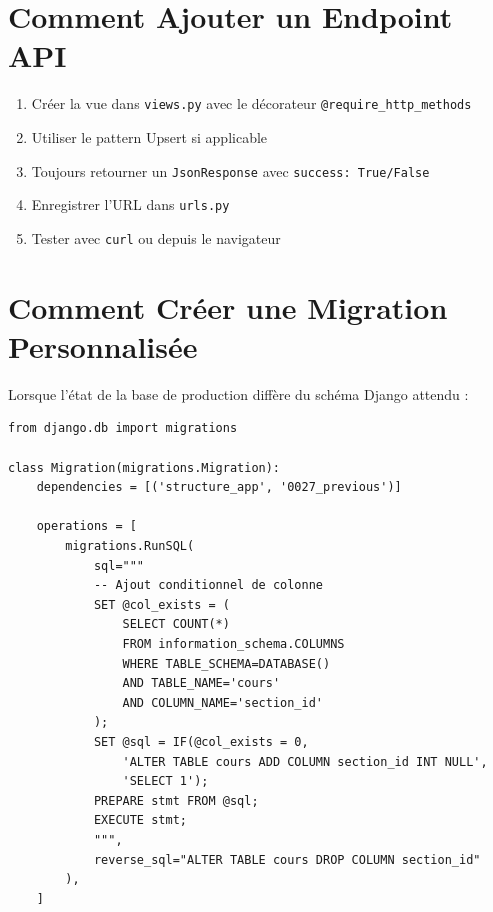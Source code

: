 \documentclass[12pt,a4paper,oneside]{report}
\begin{document}
\section{Comment Ajouter un Endpoint API}

\begin{enumerate}
  \item Créer la vue dans \texttt{views.py} avec le décorateur \texttt{@require\_http\_methods}
  \item Utiliser le pattern Upsert si applicable
  \item Toujours retourner un \texttt{JsonResponse} avec \texttt{success: True/False}
  \item Enregistrer l'URL dans \texttt{urls.py}
  \item Tester avec \texttt{curl} ou depuis le navigateur
\end{enumerate}

\section{Comment Créer une Migration Personnalisée}

Lorsque l'état de la base de production diffère du schéma Django attendu :

\begin{lstlisting}[style=python, title=Pattern RunSQL pour migrations de production]
from django.db import migrations

class Migration(migrations.Migration):
    dependencies = [('structure_app', '0027_previous')]
    
    operations = [
        migrations.RunSQL(
            sql="""
            -- Ajout conditionnel de colonne
            SET @col_exists = (
                SELECT COUNT(*) 
                FROM information_schema.COLUMNS 
                WHERE TABLE_SCHEMA=DATABASE() 
                AND TABLE_NAME='cours' 
                AND COLUMN_NAME='section_id'
            );
            SET @sql = IF(@col_exists = 0,
                'ALTER TABLE cours ADD COLUMN section_id INT NULL',
                'SELECT 1');
            PREPARE stmt FROM @sql;
            EXECUTE stmt;
            """,
            reverse_sql="ALTER TABLE cours DROP COLUMN section_id"
        ),
    ]
\end{lstlisting}


\appendix
\end{document}
